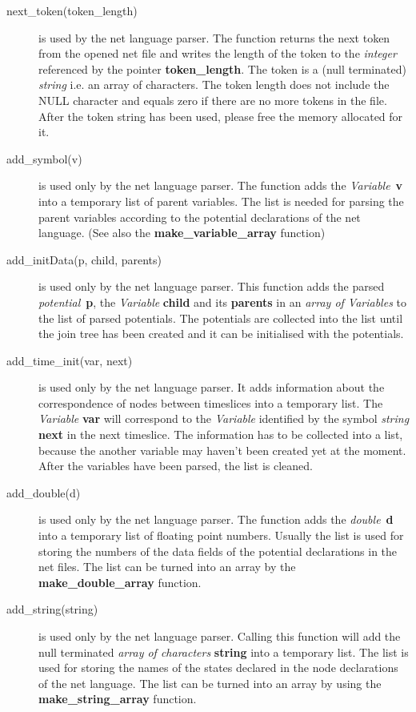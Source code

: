\documentclass[12pt,a4paper]{report}
\begin{document}
\begin{description}
\item[next\_token(token\_length)] is used by the net language
parser. The function returns the next token from the opened net file
and writes the length of the token to the {\it integer} referenced by
the pointer \textbf{token\_length}. The token is a (null terminated)
{\it string} i.e. an array of characters. The token length does not
include the NULL character and equals zero if there are no more tokens
in the file. After the token string has been used, please free the
memory allocated for it.

\item[add\_symbol(v)] is used only by the net language parser. The
function adds the {\it Variable}~\textbf{v} into a temporary list of
parent variables. The list is needed for parsing the parent variables
according to the potential declarations of the net language. (See also
the \textbf{make\_variable\_array} function)

\item[add\_initData(p, child, parents)] is used only by the net
language parser. This function adds the parsed 
{\it potential}~\textbf{p}, the {\it Variable} \textbf{child} and its
\textbf{parents} in an {\it array of Variables} to the list of parsed
potentials. The potentials are collected into the list until the
join tree has been created and it can be initialised with the potentials.

\item[add\_time\_init(var, next)] is used only by the net language
parser. It adds information about the correspondence of nodes between
timeslices into a temporary list. The {\it Variable} \textbf{var} will
correspond to the {\it Variable} identified by the symbol {\it string}
\textbf{next} in the next timeslice. The information has to be
collected into a list, because the another variable may haven't been
created yet at the moment. After the variables have been parsed, the
list is cleaned.

\item[add\_double(d)] is used only by the net language parser. The
function adds the {\it double}~\textbf{d} into a temporary list of
floating point numbers. Usually the list is used for storing the
numbers of the data fields of the potential declarations in the net
files. The list can be turned into an array by the
\textbf{make\_double\_array} function.

\item[add\_string(string)] is used only by the net language
parser. Calling this function will add the null terminated {\it array
of characters} \textbf{string} into a temporary list. The list is used
for storing the names of the states declared in the node declarations
of the net language. The list can be turned into an array by using the
\textbf{make\_string\_array} function.


\end{description}
\end{document}
